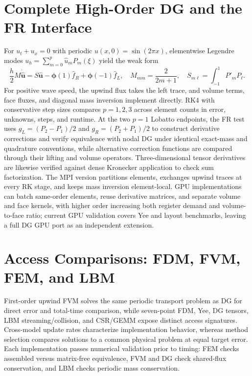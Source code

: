 \section{Complete High-Order DG and the FR Interface}
For $u_t+u_x=0$ with periodic $u(x,0)=\sin(2\pi x)$, elementwise Legendre modes $u_h=\sum_{m=0}^{p}\widehat u_mP_m(\xi)$ yield the weak form
\[
 \frac h2 M\dot{\widehat{\bm u}}
 =S\widehat{\bm u}-\bm\phi(1)\widehat f_R
                         +\bm\phi(-1)\widehat f_L,\quad
 M_{mm}=\frac2{2m+1},\quad S_{m\ell}=\int_{-1}^{1}P'_mP_\ell.
\]
For positive wave speed, the upwind flux takes the left trace, and volume terms, face fluxes, and diagonal mass inversion implement directly. RK4 with conservative step sizes compares $p=1,2,3$ across element counts in error, unknowns, steps, and runtime.
At the two $p=1$ Lobatto endpoints, the FR test uses $g_L=(P_2-P_1)/2$ and $g_R=(P_2+P_1)/2$ to construct derivative corrections and verify equivalence with nodal DG under identical exact-mass and quadrature conventions, while alternative correction functions are compared through their lifting and volume operators. Three-dimensional tensor derivatives are likewise verified against dense Kronecker application to check sum factorization.
The MPI version partitions elements, exchanges upwind traces at every RK stage, and keeps mass inversion element-local. GPU implementations can batch same-order elements, reuse derivative matrices, and separate volume and face kernels, with higher order increasing both register demand and volume-to-face ratio; current GPU validation covers Yee and layout benchmarks, leaving a full DG GPU port as an independent extension.
\section{Access Comparisons: FDM, FVM, FEM, and LBM}
First-order upwind FVM solves the same periodic transport problem as DG for direct error and total-time comparison, while seven-point FDM, Yee, DG tensors, LBM streaming/collision, and CSR/GEMM expose distinct access signatures. Cross-model update rates characterize implementation behavior, whereas method selection compares solutions to a common physical problem at equal target error.
Each implementation passes numerical validation prior to timing: FEM checks assembled versus matrix-free equivalence, FVM and DG check shared-flux conservation, and LBM checks periodic mass conservation.
